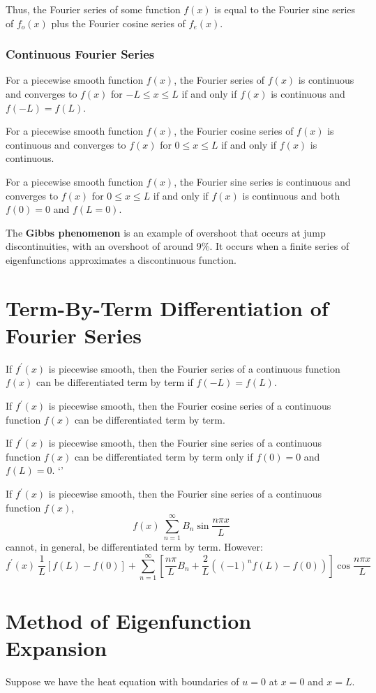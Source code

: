 \documentclass{article}
\begin{document}
Thus, the Fourier series of some function \(f(x)\) is equal to the Fourier sine series of \(f_o(x)\) plus the Fourier cosine series 
of \(f_e(x)\).

\subsubsection{Continuous Fourier Series}
For a piecewise smooth function \(f(x)\), the Fourier series of \(f(x)\) is continuous and converges to \(f(x)\) for \(-L\leq x \leq L\) if and only if 
\(f(x)\) is continuous and \(f(-L)=f(L)\).

For a piecewise smooth function \(f(x)\), the Fourier cosine series of \(f(x)\) is continuous and converges to \(f(x)\) for \(0\leq x\leq L\) if and only if \(f(x)\) is continuous.

For a piecewise smooth function \(f(x)\), the Fourier sine series is continuous and converges to \(f(x)\) for \(0\leq x\leq L\) if and only if \(f(x)\) is continuous and both \(f(0)=0\) and \(f(L=0)\).   

The \textbf{Gibbs phenomenon} is an example of overshoot that occurs at jump discontinuities, with an 
overshoot of around 9\%. It occurs when a finite series of eigenfunctions approximates a discontinuous function.

\section{Term-By-Term Differentiation of Fourier Series}
If \(f^{\prime} (x)\) is piecewise smooth, then the Fourier series of a continuous function \(f(x)\) can be differentiated term by term if \(f(-L)=f(L)\).

If \(f^{\prime} (x)\) is piecewise smooth, then the Fourier cosine series of a continuous function \(f(x)\) can be differentiated term by term.

If \(f^{\prime} (x)\) is piecewise smooth, then the Fourier sine series of a continuous function \(f(x)\) can be differentiated term by term only if \(f(0)=0\) and \(f(L)=0\).   `'

If \(f^{\prime} (x)\) is piecewise smooth, then the Fourier sine series of a continuous function \(f(x)\),
\[
    f(x)~\sum_{n=1}^{\infty }B_n \sin \frac{n \pi  x}{L}
\]  
cannot, in general, be differentiated term by term. However:
\[
    f^{\prime} (x)~\frac{1}{L}[f(L)-f(0)]+\sum_{n=1}^{\infty }[\frac{n \pi }{L}B_n+\frac{2}{L}((-1)^nf(L)-f(0))]\cos \frac{n \pi x}{L}
\]

\section{Method of Eigenfunction Expansion}
Suppose we have the heat equation with boundaries of \(u=0\) at \(x=0\) and \(x=L\).
\end{document}
